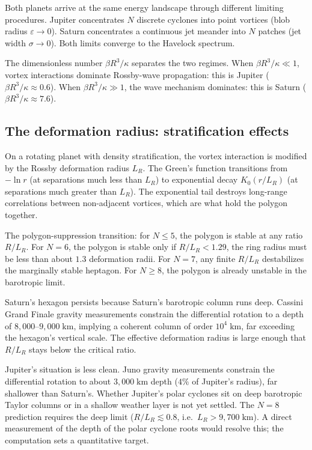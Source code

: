 Both planets arrive at the same energy landscape through different
limiting procedures. Jupiter concentrates $N$ discrete cyclones into
point vortices (blob radius $\varepsilon \to 0$). Saturn concentrates a
continuous jet meander into $N$ patches (jet width $\sigma \to 0$).
Both limits converge to the Havelock spectrum.

The dimensionless number $\beta R^3/\kappa$ separates the two regimes.
When $\beta R^3/\kappa \ll 1$, vortex interactions dominate Rossby-wave
propagation: this is Jupiter ($\beta R^3/\kappa \approx 0.6$). When
$\beta R^3/\kappa \gg 1$, the wave mechanism dominates: this is Saturn
($\beta R^3/\kappa \approx 7.6$).

\subsection*{The deformation radius: stratification effects}

On a rotating planet with density stratification, the vortex
interaction is modified by the Rossby deformation radius $L_R$. The
Green's function transitions from $-\ln r$ (at separations much less
than $L_R$) to exponential decay $K_0(r/L_R)$ (at separations much
greater than $L_R$). The exponential tail destroys long-range
correlations between non-adjacent vortices, which are what hold the
polygon together.

The polygon-suppression transition: for $N \le 5$, the polygon is
stable at any ratio $R/L_R$. For $N = 6$, the polygon is stable only
if $R/L_R < 1.29$, the ring radius must be less than about $1.3$
deformation radii. For $N = 7$, any finite $R/L_R$ destabilizes the
marginally stable heptagon. For $N \ge 8$, the polygon is already
unstable in the barotropic limit.

Saturn's hexagon persists because Saturn's barotropic column runs deep.
Cassini Grand Finale gravity measurements constrain the differential
rotation to a depth of $8{,}000$--$9{,}000\;\text{km}$, implying a
coherent column of order $10^4\;\text{km}$, far exceeding the
hexagon's vertical scale. The effective deformation radius is large
enough that $R/L_R$ stays below the critical ratio.

Jupiter's situation is less clean. Juno gravity measurements constrain
the differential rotation to about $3{,}000\;\text{km}$ depth ($4\%$ of
Jupiter's radius), far shallower than Saturn's. Whether Jupiter's polar
cyclones sit on deep barotropic Taylor columns or in a shallow weather
layer is not yet settled. The $N = 8$ prediction requires the deep
limit ($R/L_R \lesssim 0.8$, i.e.\ $L_R > 9{,}700\;\text{km}$). A
direct measurement of the depth of the polar cyclone roots would
resolve this; the computation sets a quantitative target.


